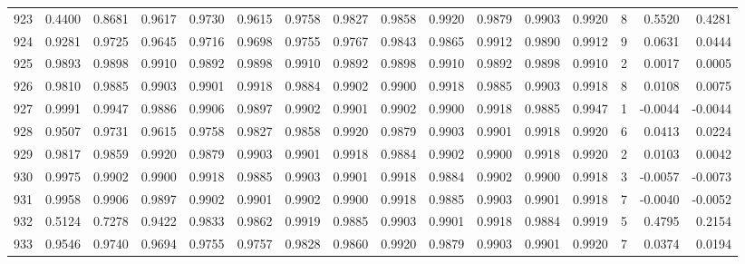 \begin{tabular}{lrrrrrrrrrrrrrrr}
923 &      0.4400 &  0.8681 &  0.9617 &  0.9730 &  0.9615 &  0.9758 &  0.9827 &  0.9858 &  0.9920 &  0.9879 &   0.9903 &     0.9920 &      8 &                    0.5520 &                     0.4281 \\
924 &      0.9281 &  0.9725 &  0.9645 &  0.9716 &  0.9698 &  0.9755 &  0.9767 &  0.9843 &  0.9865 &  0.9912 &   0.9890 &     0.9912 &      9 &                    0.0631 &                     0.0444 \\
925 &      0.9893 &  0.9898 &  0.9910 &  0.9892 &  0.9898 &  0.9910 &  0.9892 &  0.9898 &  0.9910 &  0.9892 &   0.9898 &     0.9910 &      2 &                    0.0017 &                     0.0005 \\
926 &      0.9810 &  0.9885 &  0.9903 &  0.9901 &  0.9918 &  0.9884 &  0.9902 &  0.9900 &  0.9918 &  0.9885 &   0.9903 &     0.9918 &      8 &                    0.0108 &                     0.0075 \\
927 &      0.9991 &  0.9947 &  0.9886 &  0.9906 &  0.9897 &  0.9902 &  0.9901 &  0.9902 &  0.9900 &  0.9918 &   0.9885 &     0.9947 &      1 &                   -0.0044 &                    -0.0044 \\
928 &      0.9507 &  0.9731 &  0.9615 &  0.9758 &  0.9827 &  0.9858 &  0.9920 &  0.9879 &  0.9903 &  0.9901 &   0.9918 &     0.9920 &      6 &                    0.0413 &                     0.0224 \\
929 &      0.9817 &  0.9859 &  0.9920 &  0.9879 &  0.9903 &  0.9901 &  0.9918 &  0.9884 &  0.9902 &  0.9900 &   0.9918 &     0.9920 &      2 &                    0.0103 &                     0.0042 \\
930 &      0.9975 &  0.9902 &  0.9900 &  0.9918 &  0.9885 &  0.9903 &  0.9901 &  0.9918 &  0.9884 &  0.9902 &   0.9900 &     0.9918 &      3 &                   -0.0057 &                    -0.0073 \\
931 &      0.9958 &  0.9906 &  0.9897 &  0.9902 &  0.9901 &  0.9902 &  0.9900 &  0.9918 &  0.9885 &  0.9903 &   0.9901 &     0.9918 &      7 &                   -0.0040 &                    -0.0052 \\
932 &      0.5124 &  0.7278 &  0.9422 &  0.9833 &  0.9862 &  0.9919 &  0.9885 &  0.9903 &  0.9901 &  0.9918 &   0.9884 &     0.9919 &      5 &                    0.4795 &                     0.2154 \\
933 &      0.9546 &  0.9740 &  0.9694 &  0.9755 &  0.9757 &  0.9828 &  0.9860 &  0.9920 &  0.9879 &  0.9903 &   0.9901 &     0.9920 &      7 &                    0.0374 &                     0.0194 \\

\end{tabular}
